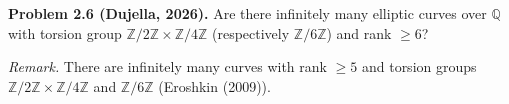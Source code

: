 \textbf{Problem 2.6 (Dujella, 2026).} Are there infinitely many elliptic curves over $\mathbb{Q}$ with torsion group $\mathbb{Z}/2\mathbb{Z}\times\mathbb{Z}/4\mathbb{Z}$ (respectively $\mathbb{Z}/6\mathbb{Z}$) and rank $\geqslant 6$?

\medskip

\textit{Remark.} There are infinitely many curves with rank $\geqslant 5$ and torsion groups $\mathbb{Z}/2\mathbb{Z}\times\mathbb{Z}/4\mathbb{Z}$ and $\mathbb{Z}/6\mathbb{Z}$ (Eroshkin (2009)).
